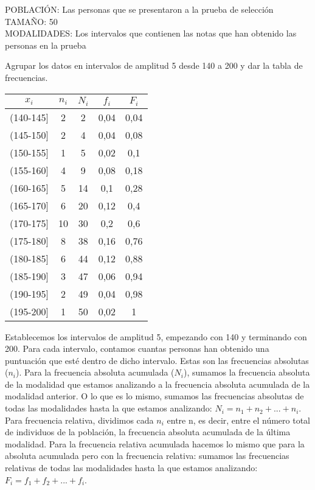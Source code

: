     POBLACIÓN: Las personas que se presentaron a la prueba de selección\\
    TAMAÑO: 50\\
    MODALIDADES: Los intervalos que contienen las notas que han obtenido las personas en la prueba
    
    \vspace{5mm}
    \subproblem
    Agrupar los datos en intervalos de amplitud 5 desde 140 a 200 y dar la tabla de frecuencias.
    \\
    \begin{center}
    \begin{tabular}{| c | c | c | c | c |}
        \hline
        $x_i$ & $n_i$ & $N_i$ & $f_i$ & $F_i$ \\ \hline
        (140-145] & 2 & 2 & 0,04 & 0,04 \\
        (145-150] & 2 & 4 & 0,04 & 0,08 \\
        (150-155] & 1 & 5 & 0,02 & 0,1 \\
        (155-160] & 4 & 9 & 0,08 & 0,18 \\
        (160-165] & 5 & 14 & 0,1 & 0,28 \\
        (165-170] & 6 & 20 & 0,12 & 0,4 \\
        (170-175] & 10 & 30 & 0,2 & 0,6 \\
        (175-180] & 8 & 38 & 0,16 & 0,76 \\
        (180-185] & 6 & 44 & 0,12 & 0,88 \\
        (185-190] & 3 & 47 & 0,06 & 0,94 \\
        (190-195] & 2 & 49 & 0,04 & 0,98 \\
        (195-200] & 1 & 50 & 0,02 & 1 \\
        \hline
    \end{tabular} 
    \end{center}
    
    \vspace{5mm}
    
    Establecemos los intervalos de amplitud 5, empezando con 140 y terminando con 200. Para cada intervalo, contamos cuantas personas han obtenido una puntuación que esté dentro de dicho intervalo. Estas son las frecuencias absolutas ($n_i$). 
    Para la frecuencia absoluta acumulada ($N_i$), sumamos la frecuencia absoluta de la modalidad que estamos analizando a la frecuencia absoluta acumulada de la modalidad anterior. O lo que es lo mismo, sumamos las frecuencias absolutas de todas las modalidades hasta la que estamos analizando: $N_i=n_1 + n_2 + ... + n_i$. 
    Para frecuencia relativa, dividimos cada $n_i$ entre n, es decir, entre el número total de individuos de la población, la frecuencia absoluta acumulada de la última modalidad. 
    Para la frecuencia relativa acumulada hacemos lo mismo que para la absoluta acumulada pero con la frecuencia relativa: sumamos las frecuencias relativas de todas las modalidades hasta la que estamos analizando: $F_i=f_1 + f_2 + ... + f_i$. 
    
